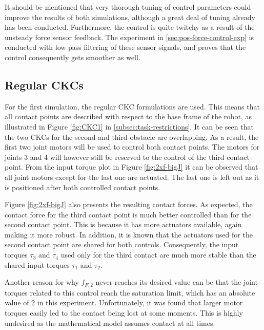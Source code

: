 It should be mentioned that very thorough tuning of control parameters could improve the results of both simulations, although a great deal of tuning already has been conducted. Furthermore, the control is quite twitchy as a result of the unsteady force sensor feedback. The experiment in \ref{sec:pos-force-control-exp} is conducted with low pass filtering of these sensor signals, and proves that the control consequently gets smoother as well.

\newpage
\subsection{Regular CKCs}

For the first simulation, the regular CKC formulations are used. This means that all contact points are described with respect to the base frame of the robot, as illustrated in Figure \ref{fig:CKC1} in \ref{subsec:task-restrictions}. It can be seen that the two CKCs for the second and third obstacle are overlapping. As a result, the first two joint motors will be used to control both contact points. The motors for joints 3 and 4 will however still be reserved to the control of the third contact point. From the input torque plot in Figure \ref{fig:2xf-bigJ} it can be observed that all joint motors except for the last one are actuated. The last one is left out as it is positioned after both controlled contact points. 

Figure \ref{fig:2xf-bigJ} also presents the resulting contact forces. As expected, the contact force for the third contact point is much better controlled than for the second contact point. This is because it has more actuators available, again making it more robust. In addition, it is known that the actuators used for the second contact point are shared for both controls. Consequently, the input torques $\tau_3$ and $\tau_4$ used only for the third contact are much more stable than the shared input torques $\tau_1$ and $\tau_2$.

Another reason for why $f_{F,2}$ never reaches its desired value can be that the joint torques related to this control reach the saturation limit, which has an absolute value of 2 in this experiment. Unfortunately, it was found that larger motor torques easily led to the contact being lost at some moments. This is highly undesired as the mathematical model assumes contact at all times.

